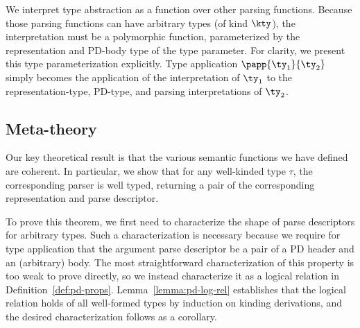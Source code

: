 {We interpret type abstraction as a function over other parsing
functions. Because those parsing functions can have
arbitrary \ddc{} types (of kind $\kty$), the interpretation must be a
polymorphic function, parameterized by the representation and PD-body
type of the \ddc{} type parameter.  For clarity, we present
this type parameterization explicitly.  Type application $\papp
{\ty_1}{\ty_2}$ simply becomes the application of the interpretation
of $\ty_1$ to the representation-type, PD-type, and parsing
interpretations of $\ty_2$.



\subsection{Meta-theory}
\label{sec:meta-theory}
Our key theoretical result is that the various semantic functions we
have defined are coherent.  In particular, we show that for any 
well-kinded \ddc{} type $\tau$, the corresponding parser is
well typed, returning a pair of the corresponding representation and
parse descriptor.  

To prove this theorem, we first need to characterize the shape of
parse descriptors for arbitrary \ddc{} types.   
Such a characterization is necessary because we require for type
application that the argument parse descriptor be a pair of a PD
header and an (arbitrary) body.
The most straightforward characterization of this property is
too weak to prove directly, so we instead characterize it
as a logical relation in Definition~\ref{def:pd-props}.
Lemma~\ref{lemma:pd-log-rel} establishes that the logical relation
holds of all well-formed \ddc{} types by induction on kinding
derivations, and the desired characterization follows as a corollary.

}
